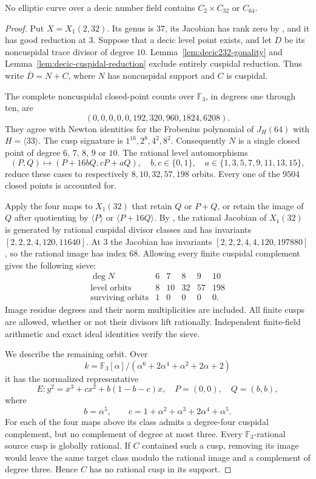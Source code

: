 \begin{proposition}\label{prop:decic232}
No elliptic curve over a decic number field contains
$C_2\times C_{32}$ or $C_{64}$.
\end{proposition}
\begin{proof}
Put $X=X_1(2,32)$. Its genus is $37$, its Jacobian has rank zero
by \cite[Theorem~3.1]{DEHMZ}, and it has good reduction at $3$.
Suppose that a decic level point exists, and let $D$ be its
noncuspidal trace divisor of degree $10$.
Lemma~\ref{lem:decic232-gonality} and
Lemma~\ref{lem:decic-cuspidal-reduction} exclude entirely cuspidal
reduction. Thus write $\overline D=N+C$, where $N$ has
noncuspidal support and $C$ is cuspidal.

The complete noncuspidal closed-point counts over $\mathbb F_3$,
in degrees one through ten, are
\[
 (0,0,0,0,0,192,320,960,1824,6208).
\]
They agree with Newton identities for the Frobenius polynomial of
$J_H(64)$ with $H=\langle33\rangle$.
The cusp signature is $1^{16},2^8,4^2,8^2$.
Consequently $N$ is a single closed point of degree $6$, $7$,
$8$, $9$ or $10$. The rational level automorphisms
\[
 (P,Q)\longmapsto(P+16bQ,cP+aQ),\quad b,c\in\{0,1\},\quad
 a\in\{1,3,5,7,9,11,13,15\},
\]
reduce these cases to respectively $8,10,32,57,198$ orbits.
Every one of the $9504$ closed points is accounted for.

Apply the four maps to $X_1(32)$ that retain $Q$ or $P+Q$, or
retain the image of $Q$ after quotienting by $\langle P\rangle$
or $\langle P+16Q\rangle$.
By \cite[Theorem~4.13 and Table~2]{DEHMZ}, the rational Jacobian
of $X_1(32)$ is generated by rational cuspidal divisor classes and
has invariants $[2,2,2,4,120,11640]$.
At $3$ the Jacobian has invariants
$[2,2,2,4,4,120,197880]$, so the rational image has index $68$.
Allowing every finite cuspidal complement gives the following sieve:
\[
\begin{array}{c|rrrrr}
\deg N&6&7&8&9&10\\\hline
\text{level orbits}&8&10&32&57&198\\
\text{surviving orbits}&1&0&0&0&0.
\end{array}
\]
Image residue degrees and their norm multiplicities are included.
All finite cusps are allowed, whether or not their divisors lift
rationally. Independent finite-field arithmetic and exact ideal
identities verify the sieve.

We describe the remaining orbit. Over
\[
 k=\mathbb F_3[\alpha]/
 (\alpha^6+2\alpha^4+\alpha^2+2\alpha+2)
\]
it has the normalized representative
\[
 E:y^2=x^3+cx^2+b(1-b-c)x,\quad P=(0,0),\quad Q=(b,b),
\]
where
\[
 b=\alpha^5,\qquad
 c=1+\alpha^2+\alpha^3+2\alpha^4+\alpha^5.
\]
For each of the four maps above its class admits a degree-four
cuspidal complement, but no complement of degree at most three.
Every $\mathbb F_3$-rational source cusp is globally rational.
If $C$ contained such a cusp, removing its image would leave the
same target class modulo the rational image and a complement of
degree three. Hence $C$ has no rational cusp in its support.


\end{proof}
